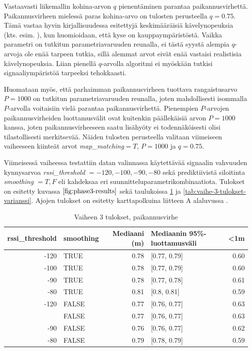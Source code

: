 \documentclass[
  12pt,
  a4paper, twoside]{book}
\begin{document}
Vastaavasti liikemallin kohina-arvon \(q\) pienentäminen parantaa paikannusvirhettä. Paikannusvirheen mielessä paras kohina-arvo on tulosten perusteella \(q=0.75\). Tämä vastaa hyvin kirjallisuudessa esitettyjä keskimääräisiä kävelynopeuksia (kts. esim. \citep{Ho-2016}), kun huomioidaan, että kyse on kauppaympäristöstä. Vaikka parametri on tutkitun parametriavaruuden reunalla, ei tästä syystä alempia \(q\)-arvoja ole enää tarpeen tutkia, sillä alemmat arvot eivät enää vastaisi realistisia kävelynopeuksia. Liian pienellä \(q\)-arvolla algoritmi ei myöskään tutkisi signaaliympäristöä tarpeeksi tehokkaasti.

Huomataan myös, että parhaimman paikannusvirheen tuottava rangaistusarvo \(P=1000\) on tutkitun parametriavaruuden reunalla, joten mahdollisesti isommalla \(P\)-arvolla voitaisiin vielä parantaa paikannusvirhettä. Pienempien \(P\)-arvojen paikannusvirheiden luottamusvälit ovat kuitenkin päällekäisiä arvon \(P=1000\) kanssa, joten paikannusvirheeseen saatu lisähyöty ei todennäköisesti olisi tilastollisesti merkitsevää. Näiden tulosten perusteella valitaan viimeiseen vaiheeseen kiinteät arvot \emph{map\_matching}\(=T\), \(P=1000\) ja \(q=0.75\).

Viimeisessä vaiheessa testattiin datan valinnassa käytettävää signaalin vahvuuden kynnysarvoa \emph{rssi\_threshold} \(={-120, -100,-90,-80}\) sekä prediktiivistä siloitinta \emph{smoothing} \(={T,F}\) eli kahdeksaa eri suunnitteluparametrikombinaatiota. Tulokset on esitetty kuvassa \(\ref{fig:phase3-results}\) sekä taulukoissa \ref{tab:vaihe-3-tulokset} ja \ref{tab:vaihe-3-tulokset-varianssi}. Ajojen tulokset on esitetty karttapolkuina liitteen A alaluvussa .

\begin{table}

\caption{\label{tab:vaihe-3-tulokset}Vaiheen 3 tulokset, paikannusvirhe}
\centering
\begin{tabular}[t]{rlrlr}
\toprule
rssi\_threshold & smoothing & Mediaani (m) & Mediaanin 95\%-luottamusväli & <1m\\
\midrule
-120 & TRUE & 0.78 & {}[0.77, 0.79] & 0.60\\
-100 & TRUE & 0.78 & {}[0.77, 0.79] & 0.60\\
-90 & TRUE & 0.78 & {}[0.77, 0.78] & 0.61\\
-80 & TRUE & 0.81 & {}[0.8, 0.81] & 0.59\\
-120 & FALSE & 0.77 & {}[0.76, 0.77] & 0.63\\
\addlinespace
-100 & FALSE & 0.77 & {}[0.76, 0.77] & 0.63\\
-90 & FALSE & 0.76 & {}[0.76, 0.77] & 0.62\\
-80 & FALSE & 0.79 & {}[0.78, 0.79] & 0.59\\
\bottomrule
\end{tabular}
\end{table}
\end{document}
